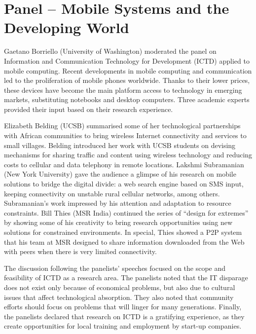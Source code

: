 \section{Panel -- Mobile Systems and the Developing World}
\label{sec:panel}

Gaetano Borriello (University of Washington) moderated the panel on
Information and Communication Technology for Development (ICTD) applied
to mobile computing. Recent developments in mobile computing and
communication led to the proliferation of mobile phones worldwide.
Thanks to their lower prices, these devices have become the main
platform access to technology in emerging markets, substituting
notebooks and desktop computers. Three academic experts provided their
input based on their research experience.

Elizabeth Belding (UCSB) summarised some of her technological
partnerships with African communities to bring wireless Internet
connectivity and services to small villages. Belding introduced her work
with UCSB students on devising mechanisms for sharing traffic and
content using wireless technology and reducing costs to cellular and
data telephony in remote locations. Lakshmi Subramanian (New York
University) gave the audience a glimpse of his research on mobile
solutions to bridge the digital divide: a web search engine based on SMS
input, keeping connectivity on unstable rural cellular networks, among
others. Subramanian's work impressed by his attention and adaptation to
resource constraints. Bill Thies (MSR India) continued the series of
``design for extremes'' by showing some of his creativity to bring
research opportunities using new solutions for constrained environments.
In special, Thies showed a P2P system that his team at MSR designed to
share information downloaded from the Web with peers when there is very
limited connectivity.

The discussion following the panelists' speeches focused on the scope
and feasibility of ICTD as a research area. The panelists noted that the
IT disparage does not exist only because of economical problems, but
also due to cultural issues that affect technological absorption. They
also noted that community efforts should focus on problems that will
linger for many generations. Finally, the panelists declared that
research on ICTD is a gratifying experience, as they create
opportunities for local training and employment by start-up companies.
